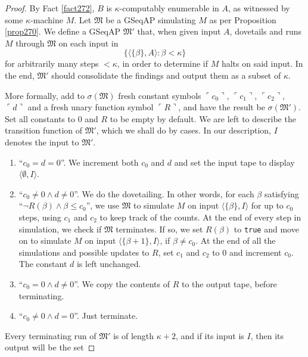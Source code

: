 \documentclass[12pt, twoside]{memoir}
\numberwithin{equation}{section}
\theoremstyle{definition}
\theoremstyle{remark}
\theoremstyle{definition}
\theoremstyle{definition}
\theoremstyle{definition}
\theoremstyle{remark}
\begin{document}
\begin{proof}
By Fact \ref{fact272}, $B$ is $\kappa$-computably enumerable in $A$, as witnessed by some $\kappa$-machine $M$. Let $\mathfrak{M}$ be a GSeqAP simulating $M$ as per Proposition \ref{prop270}. We define a GSeqAP $\mathfrak{M}'$ that, when given input $A$, dovetails and runs $M$ through $\mathfrak{M}$ on each input in
\begin{equation*}
    \{\langle \{\beta\}, A \rangle : \beta < \kappa\}
\end{equation*}
for arbitrarily many steps $< \kappa$, in order to determine if $M$ halts on said input. In the end, $\mathfrak{M}'$ should consolidate the findings and output them as a subset of $\kappa$.

More formally, add to $\sigma(\mathfrak{M})$ fresh constant symbols $\ulcorner c_0 \urcorner$, $\ulcorner c_1 \urcorner$, $\ulcorner c_2 \urcorner$, $\ulcorner d \urcorner$ and a fresh unary function symbol $\ulcorner R \urcorner$, and have the result be $\sigma(\mathfrak{M}')$. Set all constants to $0$ and $R$ to be empty by default. We are left to describe the transition function of $\mathfrak{M}'$, which we shall do by cases. In our description, $I$ denotes the input to $\mathfrak{M}'$.
\begin{enumerate}[leftmargin=60pt, label=Case \arabic*:]
    \item ``$c_0 = d = 0$''. We increment both $c_0$ and $d$ and set the input tape to display $\langle \emptyset, I \rangle$.
    \item ``$c_0 \neq 0 \wedge d \neq 0$''. We do the dovetailing. In other words, for each $\beta$ satisfying ``$\neg R(\beta) \wedge \beta \leq c_0$'', we use $\mathfrak{M}$ to simulate $M$ on input $\langle \{\beta\}, I \rangle$ for up to $c_0$ steps, using $c_1$ and $c_2$ to keep track of the counts. At the end of every step in simulation, we check if $\mathfrak{M}$ terminates. If so, we set $R(\beta)$ to \texttt{true} and move on to simulate $M$ on input $\langle \{\beta + 1\}, I \rangle$, if $\beta \neq c_0$. At the end of all the simulations and possible updates to $R$, set $c_1$ and $c_2$ to $0$ and increment $c_0$. The constant $d$ is left unchanged.
    \item\label{8340c3} ``$c_0 = 0 \wedge d \neq 0$''. We copy the contents of $R$ to the output tape, before terminating.
    \item\label{8340c4} ``$c_0 \neq 0 \wedge d = 0$''. Just terminate.
\end{enumerate}
Every terminating run of $\mathfrak{M}'$ is of length $\kappa + 2$, and if its input is $I$, then its output will be the set

\end{proof}
\end{document}
